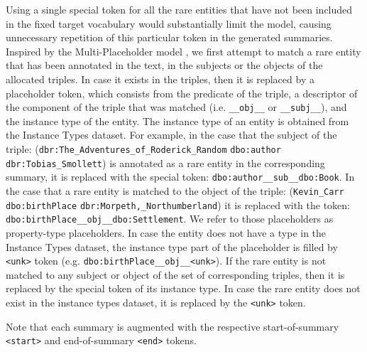 \documentclass[preprint,5p]{elsarticle}
\begin{document}
Using a single special token for all the rare entities that have not been included in the fixed target vocabulary would substantially limit the model, causing unnecessary repetition of this particular token in the generated summaries. Inspired by the Multi-Placeholder model \cite{Serban2016}, we first attempt to match a rare entity that has been annotated in the text, in the subjects or the objects of the allocated triples. In case it exists in the triples, then it is replaced by a placeholder token, which consists from the predicate of the triple, a descriptor of the component of the triple that was matched (i.e. \texttt{\_\_obj\_\_} or \texttt{\_\_subj\_\_}), and the instance type of the entity. The instance type of an entity is obtained from the Instance Types dataset. For example, in the case that the subject of the triple: (\texttt{dbr:The\_Adventures\_of\-\_Roderick\_Random} \texttt{dbo:author} \texttt{dbr:Tobias\_Smollett}) is annotated as a rare entity in the corresponding summary, it is replaced with the special token: \texttt{dbo:author\_\_sub\_\_\-dbo:Book}. In the case that a rare entity is matched to the object of the triple: (\texttt{Kevin\_Carr} \texttt{dbo:birthPlace} \texttt{dbr:Morpeth,\_Northumbe\-rland}) it is replaced with the token: \texttt{dbo:birthPlace\_\-\_obj\_\_dbo:Settlement}. We refer to those placeholders as property-type placeholders. In case the entity does not have a type in the Instance Types dataset, the instance type part of the placeholder is filled by \texttt{<unk>} token (e.g. \texttt{dbo:birthPlace\_\_obj\_\_<unk>}). If the rare entity is not matched to any subject or object of the set of corresponding triples, then it is replaced by the special token of its instance type. In case the rare entity does not exist in the instance types dataset, it is replaced by the \texttt{<unk>} token.


Note that each summary is augmented with the respective start-of-summary \texttt{<start>} and end-of-summary \texttt{<end>} tokens.
\end{document}
